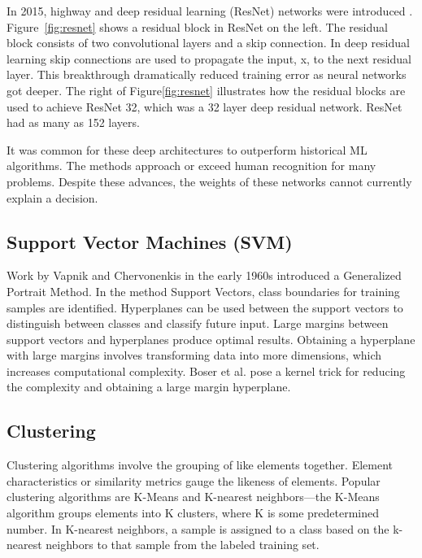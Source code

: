 In 2015, highway and deep residual learning (ResNet) networks were introduced
\cite{srivastava2015highway, 7780459}. Figure~\ref{fig:resnet} shows a residual
block in ResNet on the left. The residual block consists of two convolutional
layers and a skip connection.  In deep residual learning skip connections are
used to propagate the input, x, to the next residual layer.  This breakthrough
dramatically reduced training error as neural networks got deeper. The right of
Figure\ref{fig:resnet} illustrates how the residual blocks are used to achieve
ResNet 32, which was a 32 layer deep residual network. ResNet had as many as 152
layers.

It was common for these deep architectures to outperform historical ML
algorithms. The methods approach or exceed human recognition for many problems.
Despite these advances, the weights of these networks cannot currently explain a
decision.

\subsection{Support Vector Machines (SVM)}

Work by Vapnik and Chervonenkis in the early 1960s introduced a Generalized
Portrait Method\cite{vapnik1999nature}. In the method Support Vectors, class
boundaries for training samples are identified. Hyperplanes can be used between
the support vectors to distinguish between classes and classify future input.
Large margins between support vectors and hyperplanes produce optimal results.
Obtaining a hyperplane with large margins involves transforming data into more
dimensions, which increases computational complexity. Boser et al. pose a kernel
trick for reducing the complexity and obtaining a large margin
hyperplane\cite{boser1992training, cortes1995support}.

\subsection{Clustering}

Clustering algorithms involve the grouping of like elements together. Element
characteristics or similarity metrics gauge the likeness of elements. Popular
clustering algorithms are K-Means and K-nearest neighbors—the K-Means algorithm
groups elements into K clusters, where K is some predetermined number. In
K-nearest neighbors, a sample is assigned to a class based on the k-nearest
neighbors to that sample from the labeled training set\cite{rebala2019machine,
SINGH2024102799}.

